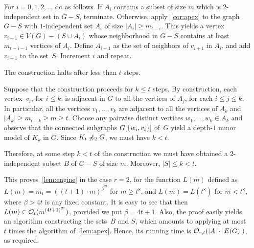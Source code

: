 For $i=0,1,2,\ldots$ do as follows.
If $A_{i}$ contains a subset of size $m$ which is $2$-independent set in $G-S$, terminate.
 Otherwise, 
 apply~\cref{cor:apex} to the graph $G-S$ with $1$-independent set
 $A_{i}$ of size $|A_i|\ge m_{t-i}$. This yields a vertex $v_{i+1}\in V(G)-(S\cup A_i)$
 whose neighborhood in $G-S$ contains at least
 $m_{t-i-1}$ vertices of $A_{i}$.
 Define $A_{i+1}$ as the set of neighbors of $v_{i+1}$ in $A_i$, and add $v_{i+1}$
 to the set~$S$.  
  Increment $i$ and repeat.

\begin{claim}\label{claim:at-most-t}
	The construction halts after less than $t$ steps.
\end{claim}
\begin{clproof}
Suppose that the construction proceeds for $k\le t$ steps.
By construction, each vertex~$v_i$, for $i\le k$, is adjacent in $G$
 to all the vertices of $A_{j}$, for each $i\le j\le k$. In particular, all the vertices $v_1,\ldots,v_k$ are adjacent to all the vertices of $A_{k}$
 and $|A_k|\ge m_{t-k}\ge m\ge t$.
Choose any pairwise distinct vertices $w_1,\ldots,w_k\in A_k$ and observe that the connected subgraphs $G[\{w_i,v_i\}]$ of~$G$ yield a depth-$1$ minor model of $K_k$ in $G$.
 Since $K_t\not\preccurlyeq_2 G$, we must have $k<t$.
 \end{clproof}
 
 Therefore, at some step $k<t$ of the construction we must have obtained a $2$-independent subset $B$ of $G-S$ of size $m$. Moreover, $|S|\le k<t$.
 
 
 
 This proves~\cref{lem:engine} in the case $r=2$, for the function $L(m)$ defined as $L(m)=m_t=((t+1)\cdot m)^{\beta^{2t}}$
 for $m\ge t^8$, and $L(m)=L(t^8)$ for $m<t^8$, where $\beta>4t$ is any fixed constant.
 It is easy to see that then $L(m)\in \mathcal{O}_{t}{(m^{{(4t+1)}^{2t}})}$, provided we put $\beta=4t+1$.
 Also, the proof easily yields an algorithm constructing the sets~$B$ and $S$,
 which amounts to applying at most $t$ times the algorithm of~\cref{lem:apex}.
 Hence, its running time  is $\mathcal{O}_{r,t}(|A|\cdot |E(G)|)$, as required.


